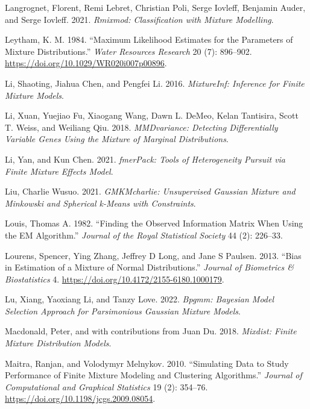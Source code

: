 \begin{CSLReferences}{1}{0}
\leavevmode{}%
Langrognet, Florent, Remi Lebret, Christian Poli, Serge Iovleff, Benjamin Auder, and Serge Iovleff. 2021. \emph{Rmixmod: Classification with Mixture Modelling}.

\leavevmode{}%
Leytham, K. M. 1984. {``Maximum {Likelihood Estimates} for the {Parameters} of {Mixture Distributions}.''} \emph{Water Resources Research} 20 (7): 896--902. \url{https://doi.org/10.1029/WR020i007p00896}.

\leavevmode{}%
Li, Shaoting, Jiahua Chen, and Pengfei Li. 2016. \emph{MixtureInf: Inference for Finite Mixture Models}.

\leavevmode{}%
Li, Xuan, Yuejiao Fu, Xiaogang Wang, Dawn L. DeMeo, Kelan Tantisira, Scott T. Weiss, and Weiliang Qiu. 2018. \emph{MMDvariance: Detecting Differentially Variable Genes Using the Mixture of Marginal Distributions}.

\leavevmode{}%
Li, Yan, and Kun Chen. 2021. \emph{fmerPack: Tools of Heterogeneity Pursuit via Finite Mixture Effects Model}.

\leavevmode{}%
Liu, Charlie Wusuo. 2021. \emph{GMKMcharlie: Unsupervised Gaussian Mixture and Minkowski and Spherical k-Means with Constraints}.

\leavevmode{}%
Louis, Thomas A. 1982. {``Finding the {Observed Information Matrix} When {Using} the {EM Algorithm}.''} \emph{Journal of the Royal Statistical Society} 44 (2): 226--33.

\leavevmode{}%
Lourens, Spencer, Ying Zhang, Jeffrey D Long, and Jane S Paulsen. 2013. {``Bias in {Estimation} of a {Mixture} of {Normal Distributions}.''} \emph{Journal of Biometrics \& Biostatistics} 4. \url{https://doi.org/10.4172/2155-6180.1000179}.

\leavevmode{}%
Lu, Xiang, Yaoxiang Li, and Tanzy Love. 2022. \emph{Bpgmm: Bayesian Model Selection Approach for Parsimonious Gaussian Mixture Models}.

\leavevmode{}%
Macdonald, Peter, and with contributions from Juan Du. 2018. \emph{Mixdist: Finite Mixture Distribution Models}.

\leavevmode{}%
Maitra, Ranjan, and Volodymyr Melnykov. 2010. {``Simulating {Data} to {Study Performance} of {Finite Mixture Modeling} and {Clustering Algorithms}.''} \emph{Journal of Computational and Graphical Statistics} 19 (2): 354--76. \url{https://doi.org/10.1198/jcgs.2009.08054}.


\end{CSLReferences}
